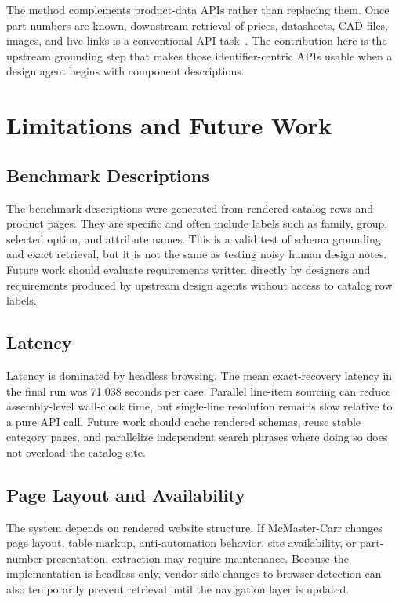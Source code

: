 \documentclass[colorlinks,upint,subscriptcorrection,varvw,hyphenate,balance,nofoot]{asmeconf}
\begin{document}
The method complements product-data APIs rather than replacing them. Once part numbers are known, downstream retrieval of prices, datasheets, CAD files, images, and live links is a conventional API task~\cite{mcmasterapi}. The contribution here is the upstream grounding step that makes those identifier-centric APIs usable when a design agent begins with component descriptions.

\section{Limitations and Future Work}

\subsection{Benchmark Descriptions}

The benchmark descriptions were generated from rendered catalog rows and product pages. They are specific and often include labels such as family, group, selected option, and attribute names. This is a valid test of schema grounding and exact retrieval, but it is not the same as testing noisy human design notes. Future work should evaluate requirements written directly by designers and requirements produced by upstream design agents without access to catalog row labels.

\subsection{Latency}

Latency is dominated by headless browsing. The mean exact-recovery latency in the final run was 71.038 seconds per case. Parallel line-item sourcing can reduce assembly-level wall-clock time, but single-line resolution remains slow relative to a pure API call. Future work should cache rendered schemas, reuse stable category pages, and parallelize independent search phrases where doing so does not overload the catalog site.

\subsection{Page Layout and Availability}

The system depends on rendered website structure. If McMaster-Carr changes page layout, table markup, anti-automation behavior, site availability, or part-number presentation, extraction may require maintenance. Because the implementation is headless-only, vendor-side changes to browser detection can also temporarily prevent retrieval until the navigation layer is updated.
\end{document}
